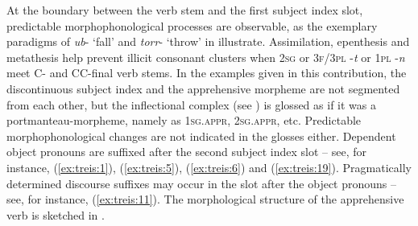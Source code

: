 \documentclass[output=paper,colorlinks,citecolor=brown,
]{langsci/langscibook}
\begin{document}
\begin{table}
    \caption{The apprehensive paradigm}
    \label{tab:treis:2}
\end{table}

At the boundary between the verb stem and the first subject index slot, predictable morphophonological processes are observable, as the exemplary paradigms of \textit{ub}- `fall' and \textit{torr}- `throw' in  illustrate. Assimilation, epenthesis and metathesis help prevent illicit consonant clusters when \textsc{2sg} or \textsc{3f/3pl} -\textit{t} or \textsc{1pl} \nobreakdash-\textit{n} meet C- and CC-final verb stems. In the examples given in this contribution, the discontinuous subject index and the apprehensive morpheme are not segmented from each other, but the inflectional complex (see ) is glossed as if it was a portmanteau-morpheme, namely as \textsc{1sg.appr}, \textsc{2sg.appr}, etc. Predictable morphophonological changes are not indicated in the glosses either. 
Dependent object pronouns are suffixed after the second subject index slot -- see, for instance, (\ref{ex:treis:1}), (\ref{ex:treis:5}), (\ref{ex:treis:6}) and (\ref{ex:treis:19}). Pragmatically determined discourse suffixes may occur in the slot after the object pronouns -- see, for instance, (\ref{ex:treis:11}). The morphological structure of the apprehensive verb is sketched in .
\end{document}
